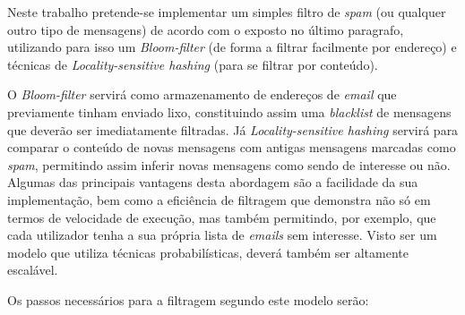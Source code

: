 \documentclass[a4paper,11pt,openright,oneside]{report}
\begin{document}
Neste trabalho pretende-se implementar um simples filtro de \textit{spam} (ou qualquer outro tipo de mensagens) de acordo com o exposto no último paragrafo, utilizando para isso um \textit{Bloom-filter} (de forma a filtrar facilmente por endereço) e técnicas de \textit{Locality-sensitive hashing} (para se filtrar por conteúdo).

O \textit{Bloom-filter} servirá como armazenamento de endereços de \textit{email} que previamente tinham enviado lixo, constituindo assim uma \textit{blacklist} de mensagens que deverão ser imediatamente filtradas. Já \textit{Locality-sensitive hashing} servirá para comparar o conteúdo de novas mensagens com antigas mensagens marcadas como \textit{spam}, permitindo assim inferir novas mensagens como sendo de interesse ou não. Algumas das principais vantagens desta abordagem são a facilidade da sua implementação, bem como a eficiência de filtragem que demonstra não só em termos de velocidade de execução, mas também permitindo, por exemplo, que cada utilizador tenha a sua própria lista de \textit{emails} sem interesse. Visto ser um modelo que utiliza técnicas probabilísticas, deverá também ser altamente escalável.

Os passos necessários para a filtragem segundo este modelo serão:
\end{document}
